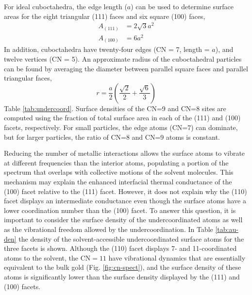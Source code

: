 For ideal cuboctahedra, the edge length ($a$) can be used to determine
surface areas for the eight triangular (111) faces and six square
(100) faces,
\begin{align}
A_\mathrm{(111)} &= 2 \sqrt{3} a^2 \\
A_\mathrm{(100)} &= 6 a^2
\end{align}
In addition, cuboctahedra have twenty-four edges (CN = 7, length =
$a$), and twelve vertices (CN = 5).  An approximate radius of the
cuboctahedral particles can be found by averaging the diameter between
parallel square faces and parallel triangular faces,
\begin{equation}
r  = \frac{a}{2} \left(\frac{\sqrt{2}}{2} + \frac{\sqrt{6}}{3}\right)
\label{r_ave}
\end{equation}
Table \ref{tab:undercoord}.  Surface densities of the CN=9 and CN=8
sites are computed using the fraction of total surface area in each of
the (111) and (100) facets, respectively.  For small particles, the
edge atoms (CN=7) can dominate, but for larger particles, the ratio of
CN=8 and CN=9 atoms is constant.




Reducing the number of metallic interactions allows the surface atoms
to vibrate at different frequencies than the interior atoms,
populating a portion of the spectrum that overlaps with collective
motions of the solvent molecules. This mechanism may explain the
enhanced interfacial thermal conductance of the (100) facet relative
to the (111) facet. However, it does not explain why the (110) facet
displays an intermediate conductance even though the surface atoms
have a lower coordination number than the (100) facet.  To answer this
question, it is important to consider the surface density of the
undercoordinated atoms as well as the vibrational freedom allowed by
the undercoordination. In Table \ref{tab:au-den} the density
of the solvent-accessible undercoordinated surface atoms for the three
facets is shown. Although the (110) facet displays 7- and 11-coordinated atoms
to the solvent, the $\text{CN}=11$ have vibrational dynamics that are
essentially equivalent to the bulk gold (Fig. \ref{fig:cn-spect}), and the
surface density of these atoms is significantly lower than the surface
density displayed by the (111) and (100) facets.

